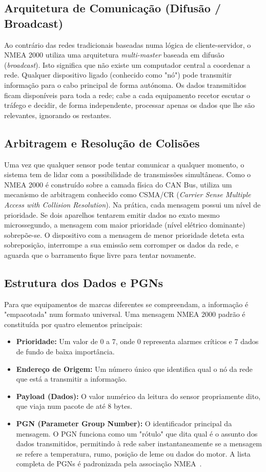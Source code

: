 \subsection{Arquitetura de Comunicação (Difusão / Broadcast)}
Ao contrário das redes tradicionais baseadas numa lógica de cliente-servidor, o NMEA 2000 utiliza uma arquitetura \textit{multi-master} baseada em difusão (\textit{broadcast}). Isto significa que não existe um computador central a coordenar a rede. Qualquer dispositivo ligado (conhecido como "nó") pode transmitir informação para o cabo principal de forma autónoma. Os dados transmitidos ficam disponíveis para toda a rede; cabe a cada equipamento recetor escutar o tráfego e decidir, de forma independente, processar apenas os dados que lhe são relevantes, ignorando os restantes.

\subsection{Arbitragem e Resolução de Colisões}
Uma vez que qualquer sensor pode tentar comunicar a qualquer momento, o sistema tem de lidar com a possibilidade de transmissões simultâneas. Como o NMEA 2000 é construído sobre a camada física do CAN Bus, utiliza um mecanismo de arbitragem conhecido como CSMA/CR (\textit{Carrier Sense Multiple Access with Collision Resolution}). Na prática, cada mensagem possui um nível de prioridade. Se dois aparelhos tentarem emitir dados no exato mesmo microssegundo, a mensagem com maior prioridade (nível elétrico dominante) sobrepõe-se. O dispositivo com a mensagem de menor prioridade deteta esta sobreposição, interrompe a sua emissão sem corromper os dados da rede, e aguarda que o barramento fique livre para tentar novamente.

\subsection{Estrutura dos Dados e PGNs}
Para que equipamentos de marcas diferentes se compreendam, a informação é "empacotada" num formato universal. Uma mensagem NMEA 2000 padrão é constituída por quatro elementos principais:
\begin{itemize}
    \item \textbf{Prioridade:} Um valor de 0 a 7, onde 0 representa alarmes críticos e 7 dados de fundo de baixa importância.
    \item \textbf{Endereço de Origem:} Um número único que identifica qual o nó da rede que está a transmitir a informação.
    \item \textbf{Payload (Dados):} O valor numérico da leitura do sensor propriamente dito, que viaja num pacote de até 8 bytes.
    \item \textbf{PGN (Parameter Group Number):} O identificador principal da mensagem. O PGN funciona como um "rótulo" que dita qual é o assunto dos dados transmitidos, permitindo à rede saber instantaneamente se a mensagem se refere a temperatura, rumo, posição de leme ou dados do motor. A lista completa de PGNs é padronizada pela associação NMEA~\cite{nmea_electric_pgn}.
\end{itemize}

